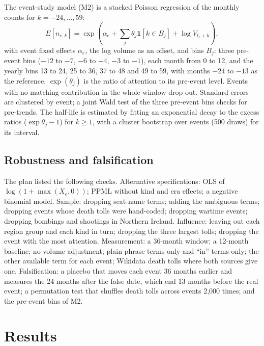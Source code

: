 \documentclass[11pt,a4paper]{article}
\begin{document}
The event-study model (M2) is a stacked Poisson regression of the monthly counts for $k = -24, \dots, 59$:
\begin{equation}
E[n_{e,k}] = \exp\left(\alpha_e + \textstyle\sum_{j} \theta_j \mathbf{1}[k \in B_j] + \log V_{t_e + k}\right),
\end{equation}
with event fixed effects $\alpha_e$, the log volume as an offset, and bins $B_j$: three pre-event bins ($-12$ to $-7$, $-6$ to $-4$, $-3$ to $-1$), each month from 0 to 12, and the yearly bins 13 to 24, 25 to 36, 37 to 48 and 49 to 59, with months $-24$ to $-13$ as the reference. $\exp(\theta_j)$ is the ratio of attention to its pre-event level. Events with no matching contribution in the whole window drop out. Standard errors are clustered by event; a joint Wald test of the three pre-event bins checks for pre-trends. The half-life is estimated by fitting an exponential decay to the excess ratios ($\exp\theta_j - 1$) for $k \geq 1$, with a cluster bootstrap over events (500 draws) for its interval.

\subsection{Robustness and falsification}
The plan listed the following checks. Alternative specifications: OLS of $\log(1 + \max(X_e, 0))$; PPML without kind and era effects; a negative binomial model. Sample: dropping seat-name terms; adding the ambiguous terms; dropping events whose death tolls were hand-coded; dropping wartime events; dropping bombings and shootings in Northern Ireland. Influence: leaving out each region group and each kind in turn; dropping the three largest tolls; dropping the event with the most attention. Measurement: a 36-month window; a 12-month baseline; no volume adjustment; plain-phrase terms only and ``in'' terms only; the other available term for each event; Wikidata death tolls where both sources give one. Falsification: a placebo that moves each event 36 months earlier and measures the 24 months after the false date, which end 13 months before the real event; a permutation test that shuffles death tolls across events 2,000 times; and the pre-event bins of M2.

\section{Results}
\label{sec:results}
\end{document}
